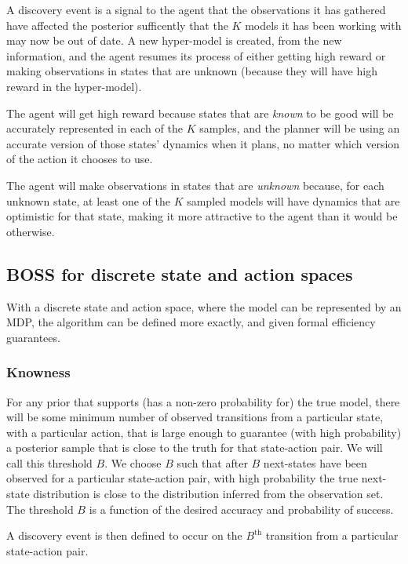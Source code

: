A discovery event is a signal to the agent that the observations it has gathered have affected the posterior sufficently that the $K$ models it has been working with may now be out of date. A new hyper-model is created, from the new information, and the agent resumes its process of either getting high reward or making observations in states that are unknown (because they will have high reward in the hyper-model).

The agent will get high reward because states that are \emph{known} to be good will be accurately represented in each of the $K$ samples, and the planner will be using an accurate version of those states' dynamics when it plans, no matter which version of the action it chooses to use.

The agent will make observations in states that are \emph{unknown} because, for each unknown state, at least one of the $K$ sampled models will have dynamics that are optimistic for that state, making it more attractive to the agent than it would be otherwise.

\subsection{BOSS for discrete state and action spaces}
\label{boss:alg:disc}

With a discrete state and action space, where the model can be represented by an MDP, the  algorithm can be defined more exactly, and given formal efficiency guarantees.

\subsubsection{Knowness}

For any prior that supports (has a non-zero probability for) the true model, there will be some minimum number of observed transitions from a particular state, with a particular action, that is large enough to guarantee (with high probability) a posterior sample that is close to the truth for that state-action pair. We will call this threshold $B$. We choose $B$ such that after $B$ next-states have been observed for a particular state-action pair, with high probability the true next-state distribution is close to the distribution inferred from the observation set. The threshold $B$ is a function of the desired accuracy and probability of success.

A discovery event is then defined to occur on the $B^{\mbox{th}}$ transition from a particular state-action pair.

